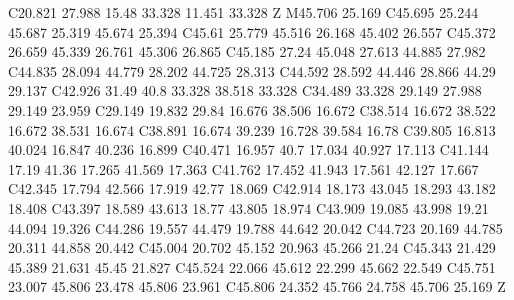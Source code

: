 {\begin{scope}[cm={0.569055,0,0,-0.569055,(-0.5cm,0.5cm)}]
{      C20.821 27.988 15.48 33.328 11.451 33.328 Z M45.706 25.169
      C45.695 25.244 45.687 25.319 45.674 25.394 C45.61 25.779 45.516 26.168 45.402 26.557
      C45.372 26.659 45.339 26.761 45.306 26.865 C45.185 27.24 45.048 27.613 44.885 27.982
      C44.835 28.094 44.779 28.202 44.725 28.313 C44.592 28.592 44.446 28.866 44.29 29.137
      C42.926 31.49 40.8 33.328 38.518 33.328 C34.489 33.328 29.149 27.988 29.149 23.959
      C29.149 19.832 29.84 16.676 38.506 16.672 C38.514 16.672 38.522 16.672 38.531 16.674
      C38.891 16.674 39.239 16.728 39.584 16.78 C39.805 16.813 40.024 16.847 40.236 16.899
      C40.471 16.957 40.7 17.034 40.927 17.113 C41.144 17.19 41.36 17.265 41.569 17.363
      C41.762 17.452 41.943 17.561 42.127 17.667 C42.345 17.794 42.566 17.919 42.77 18.069
      C42.914 18.173 43.045 18.293 43.182 18.408 C43.397 18.589 43.613 18.77 43.805 18.974
      C43.909 19.085 43.998 19.21 44.094 19.326 C44.286 19.557 44.479 19.788 44.642 20.042
      C44.723 20.169 44.785 20.311 44.858 20.442 C45.004 20.702 45.152 20.963 45.266 21.24
      C45.343 21.429 45.389 21.631 45.45 21.827 C45.524 22.066 45.612 22.299 45.662 22.549
      C45.751 23.007 45.806 23.478 45.806 23.961 C45.806 24.352 45.766 24.758 45.706 25.169 Z
    }
  \end{scope}
}

